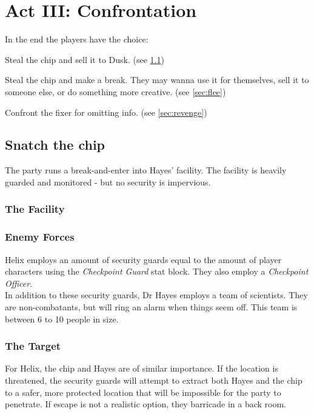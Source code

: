 \chapter{Act III: Confrontation}
\label{ch:act3}
In the end the players have the choice:
\begin{sitemize}
	\item Steal the chip and sell it to Dusk.
		(see \ref{sec:steal})
	\item Steal the chip and make a break.
		They may wanna use it for themselves,
		sell it to someone else,
		or do something more creative.
		(see \ref{sec:flee})
	\item Confront the fixer for omitting info.
		(see \ref{sec:revenge})
\end{sitemize}

\section{Snatch the chip}
\label{sec:steal}
The party runs a break-and-enter into Hayes' facility.
The facility is heavily guarded and monitored
	- but no security is impervious.
\subsection*{The Facility}
\subsection*{Enemy Forces}
Helix employs an amount of security guards
	equal to the amount of player characters
	using the \emph{Checkpoint Guard} stat block.
They also employ a \emph{Checkpoint Officer}.
\\%
In addition to these security guards,
	Dr Hayes employs a team of scientists.
They are non-combatants,
	but will ring an alarm
	when things seem off.
This team is between 6 to 10 people in size.
\subsection*{The Target}
For Helix, the chip and Hayes are of similar importance.
If the location is threatened,
	the security guards will attempt to extract
	both Hayes and the chip
	to a safer, more protected location that will be impossible for the party to penetrate.
If escape is not a realistic option,
	they barricade in a back room.

